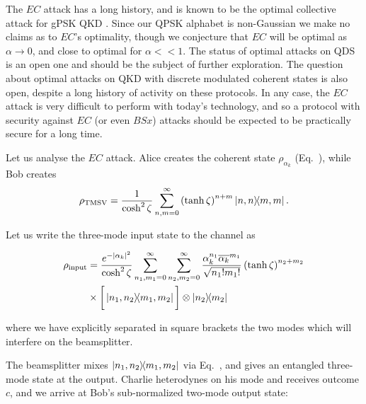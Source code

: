 The $EC$ attack has a long history, and is known to be the optimal collective attack for gPSK QKD . Since our QPSK alphabet is non-Gaussian we make no claims as to $EC$'s optimality, though we conjecture that $EC$ will be optimal as $\alpha \rightarrow 0$, and close to optimal for $\alpha << 1$. The status of optimal attacks on QDS is an open one and should be the subject of further exploration. The question about optimal attacks on QKD with discrete modulated coherent states is also open, despite a long history of activity on these protocols. In any case, the $EC$ attack is very difficult to perform with today's technology, and so a protocol with security against $EC$ (or even $BSx$) attacks should be expected to be practically secure for a long time.


Let us analyse the $EC$ attack. Alice creates the coherent state $\rho_{\alpha_k}$ (Eq.~), while Bob creates
\begin{equation}
\tmsv = \frac{1}{\cosh^2 \zeta}  \sum_{n, m=0}^\infty \left(\tanh\zeta\right)^{n+m} \dyad{n, n}{m, m}.
\end{equation}

\noindent Let us write the three-mode input state to the channel as

\begin{align}
\rho_{\text{input}} &= \frac{e^{-\left|\alpha_k\right|^2}}{\cosh^2 \zeta} \sum_{n_1, m_1=0}^\infty \sum_{n_2, m_2=0}^{\infty} \frac{\alpha_k^{n_1} \overline{\alpha_k}^{m_1}}{\sqrt{n_1! m_1!}} \left(\tanh\zeta\right)^{n_2 + m_2} \notag \\
&\times \bigg[\dyad{n_1, n_2}{m_1, m_2}\bigg] \otimes \dyad{n_2}{m_2}
\end{align}

\noindent where we have explicitly separated in square brackets the two modes which will interfere on the beamsplitter.

The beamsplitter mixes $\dyad{n_1, n_2}{m_1, m_2}$ via Eq.~, and gives an entangled three-mode state at the output. Charlie heterodynes on his mode and receives outcome $c$, and we arrive at Bob's sub-normalized two-mode output state:

